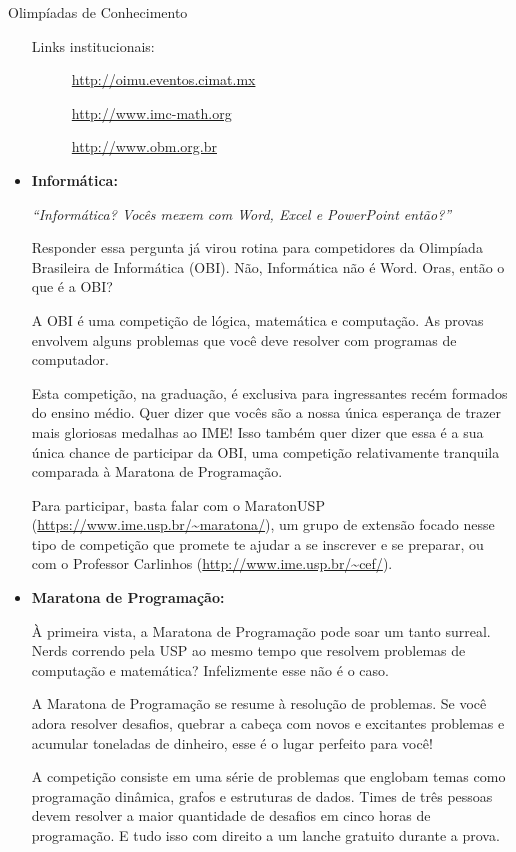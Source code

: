 \begin{subsecao}{Olimpíadas de Conhecimento}
\begin{itemize}
Links institucionais:

\begin{description}
  \item[] \url{http://oimu.eventos.cimat.mx}
  \item[] \url{http://www.imc-math.org}
  \item[] \url{http://www.obm.org.br}
\end{description}

\item{\bf Informática: }

\textit{``Informática? Vocês mexem com Word, Excel e PowerPoint então?''}

Responder essa pergunta já virou rotina para competidores da Olimpíada
Brasileira de Informática (OBI). Não, Informática não é Word. Oras, então o que é a OBI?

A OBI é uma competição de lógica, matemática e computação. As provas envolvem
alguns problemas que você deve resolver com programas de computador.

Esta competição, na graduação, é exclusiva para ingressantes recém formados do
ensino médio. Quer dizer que vocês são a nossa única esperança de trazer mais
gloriosas medalhas ao IME! Isso também quer dizer que essa é a sua única chance
de participar da OBI, uma competição relativamente tranquila comparada à
Maratona de Programação.

Para participar, basta falar com o MaratonUSP
(\url{https://www.ime.usp.br/~maratona/}), um grupo de extensão focado nesse
tipo de competição que promete te ajudar a se inscrever e se preparar, ou com o
Professor Carlinhos (\url{http://www.ime.usp.br/~cef/}).

\item{\bf Maratona de Programação: }

À primeira vista, a Maratona de Programação pode soar um tanto
surreal. Nerds correndo pela USP ao mesmo tempo que resolvem
problemas de computação e matemática? Infelizmente esse não
é o caso.

A Maratona de Programação se resume à resolução de problemas.
Se você adora resolver desafios, quebrar a cabeça com novos
e excitantes problemas e acumular toneladas de dinheiro, esse
é o lugar perfeito para você!

A competição consiste em uma série de problemas que englobam
temas como programação dinâmica, grafos e estruturas de dados.
Times de três pessoas devem resolver a maior quantidade de
desafios em cinco horas de programação. E tudo isso com direito
a um lanche gratuito durante a prova.


\end{itemize}
\end{subsecao}
